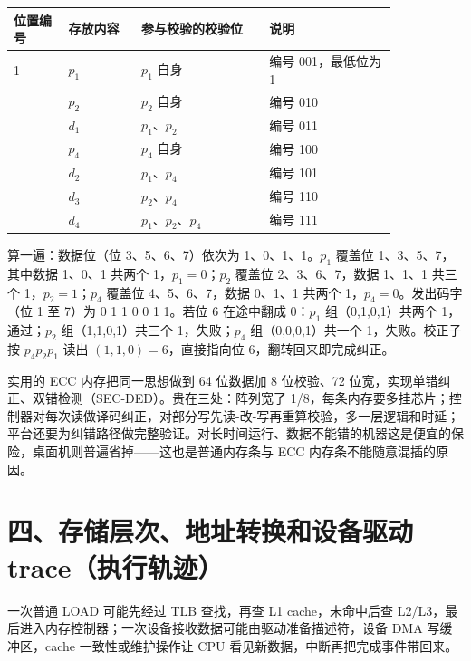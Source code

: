 \begin{longtable}{L{0.12\linewidth}L{0.16\linewidth}L{0.28\linewidth}L{0.28\linewidth}}
\toprule
位置编号 & 存放内容 & 参与校验的校验位 & 说明 \\
 & $p_1$ & $p_1$ 自身 & 编号 001，最低位为 1 \\ & $p_2$ & $p_2$ 自身 & 编号 010 \\ & $d_1$ & $p_1$、$p_2$ & 编号 011 \\ & $p_4$ & $p_4$ 自身 & 编号 100 \\ & $d_2$ & $p_1$、$p_4$ & 编号 101 \\ & $d_3$ & $p_2$、$p_4$ & 编号 110 \\ & $d_4$ & $p_1$、$p_2$、$p_4$ & 编号 111 \\
\bottomrule
\end{longtable}

算一遍：数据位（位 3、5、6、7）依次为 1、0、1、1。$p_1$ 覆盖位 1、3、5、7，其中数据 1、0、1 共两个 1，$p_1=0$；$p_2$ 覆盖位 2、3、6、7，数据 1、1、1 共三个 1，$p_2=1$；$p_4$ 覆盖位 4、5、6、7，数据 0、1、1 共两个 1，$p_4=0$。发出码字（位 1 至 7）为 0 1 1 0 0 1 1。若位 6 在途中翻成 0：$p_1$ 组（0,1,0,1）共两个 1，通过；$p_2$ 组（1,1,0,1）共三个 1，失败；$p_4$ 组（0,0,0,1）共一个 1，失败。校正子按 $p_4p_2p_1$ 读出 $(1,1,0)=6$，直接指向位 6，翻转回来即完成纠正。

实用的 ECC 内存把同一思想做到 64 位数据加 8 位校验、72 位宽，实现单错纠正、双错检测（SEC-DED）。贵在三处：阵列宽了 1/8，每条内存要多挂芯片；控制器对每次读做译码纠正，对部分写先读-改-写再重算校验，多一层逻辑和时延；平台还要为纠错路径做完整验证。对长时间运行、数据不能错的机器这是便宜的保险，桌面机则普遍省掉——这也是普通内存条与 ECC 内存条不能随意混插的原因。

\section{四、存储层次、地址转换和设备驱动 trace（执行轨迹）}

一次普通 LOAD 可能先经过 TLB 查找，再查 L1 cache，未命中后查 L2/L3，最后进入内存控制器；一次设备接收数据可能由驱动准备描述符，设备 DMA 写缓冲区，cache 一致性或维护操作让 CPU 看见新数据，中断再把完成事件带回来。

